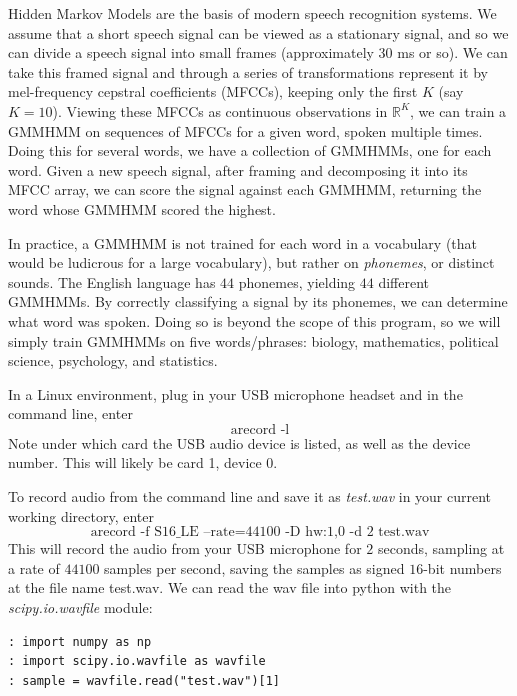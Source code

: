 

Hidden Markov Models are the basis of modern speech recognition systems. We assume that a short speech signal can be viewed as a stationary signal, and so we can divide a speech signal into small frames (approximately $30$ ms or so). We can take this framed signal and through a series of transformations represent it by mel-frequency cepstral coefficients (MFCCs), keeping only the first $K$ (say $K = 10$). Viewing these MFCCs as continuous observations in $\mathbb{R}^{K}$, we can train a GMMHMM on sequences of MFCCs for a given word, spoken multiple times. Doing this for several words, we have a collection of GMMHMMs, one for each word. Given a new speech signal, after framing and decomposing it into its MFCC array, we can score the signal against each GMMHMM, returning the word whose GMMHMM scored the highest.

In practice, a GMMHMM is not trained for each word in a vocabulary (that would be ludicrous for a large vocabulary), but rather on \emph{phonemes}, or distinct sounds. The English language has $44$ phonemes, yielding $44$ different GMMHMMs. By correctly classifying a signal by its phonemes, we can determine what word was spoken. Doing so is beyond the scope of this program, so we will simply train GMMHMMs on five words/phrases: biology, mathematics, political science, psychology, and statistics.

In a Linux environment, plug in your USB microphone headset and in the command line, enter
$$\text{arecord -l}$$
Note under which card the USB audio device is listed, as well as the device number. This will likely be card 1, device 0.

To record audio from the command line and save it as \emph{test.wav} in your current working directory, enter
$$\text{arecord -f S16\_LE --rate=44100 -D hw:1,0 -d 2 test.wav}$$
This will record the audio from your USB microphone for $2$ seconds, sampling at a rate of $44100$ samples per second, saving the samples as signed $16$-bit numbers at the file name test.wav. We can read the wav file into python with the \emph{scipy.io.wavfile} module:

\begin{lstlisting}[style=python]
: import numpy as np
: import scipy.io.wavfile as wavfile
: sample = wavfile.read("test.wav")[1]
\end{lstlisting}

